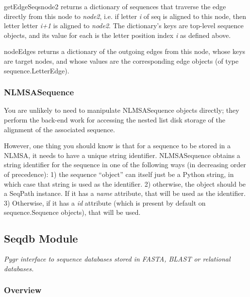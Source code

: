 \documentclass{howto}
\begin{document}
\begin{funcdesc}{getEdgeSeqs}{node2}
  returns a dictionary of sequences
  that traverse the edge directly from this node to {\em node2},
  i.e. if letter {\em i} of seq is aligned to this node, then
  letter letter {\em i+1} is aligned to {\em node2}.  The
  dictionary's keys are top-level sequence objects, and its
  value for each is the letter position index {\em i} as defined above.
\end{funcdesc}

\begin{funcdesc}{nodeEdges}{}
  returns a dictionary of the outgoing edges
  from this node, whose keys are target nodes, and whose values
  are the corresponding edge objects (of type sequence.LetterEdge).
\end{funcdesc}


\subsubsection{NLMSASequence}
You are unlikely to need to manipulate NLMSASequence objects directly;
they perform the back-end work for accessing the nested list disk storage
of the alignment of the associated sequence.

However, one thing you should know is that for a sequence to be stored
in a NLMSA, it needs to have a unique string identifier.
NLMSASequence obtains a string identifier for the sequence in one of the following
ways (in decreasing order of precedence): 1) the sequence ``object'' can itself just
be a Python string, in which case that string is used as the identifier. 2) otherwise,
the object should be a SeqPath instance.  If it has a {\em name} attribute, that will
be used as the identifier. 3) Otherwise, if it has a {\em id} attribute (which is present
by default on sequence.Sequence objects), that will be used.


\subsection{Seqdb Module}
\label{seqdb}

{\em Pygr interface to sequence databases stored in FASTA, BLAST or relational databases.}


\subsubsection{Overview}
\end{document}
